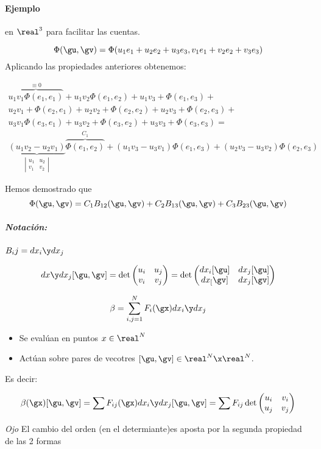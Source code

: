 \paragraph{Ejemplo} en $\real^3$ para facilitar las cuentas.

\[\Phi(\gu,\gv) = \Phi(u_1e_1+u_2e_2+u_3e_3,v_1e_1+v_2e_2+v_3e_3)\]
Aplicando las propiedades anteriores obtenemos:

\begin{gather*}
\overbrace{u_1v_1\Phi(e_1,e_1)}^{\equiv 0} + u_1v_2\Phi(e_1,e_2) + u_1v_3+\Phi(e_1,e_3)+\\
u_2v_1+\Phi(e_2,e_1)+u_2v_2+\Phi(e_2,e_2)+u_2v_3+\Phi(e_2,e_3)+\\
u_3v_1\Phi(e_3,e_1)+u_3v_2+\Phi(e_3,e_2)+u_3v_3+\Phi(e_3,e_3) = \\
\underbrace{(u_1v_2-u_2v_1)}_{\left|\begin{matrix}
u_1&u_2\\v_1&v_2
\end{matrix}\right|}\overbrace{\Phi(e_1,e_2)}^{C_1}+(u_1v_3-u_3v_1)\Phi(e_1,e_3)+(u_2v_3-u_3v_2)\Phi(e_2,e_3)
\end{gather*}

Hemos demostrado que \[\Phi(\gu,\gv) = C_1B_{12}(\gu,\gv) + C_2B_{13}(\gu,\gv) + C_3B_{23}(\gu,\gv)\]

\subparagraph{Notación:} $B_ij = dx_i\y dx_j$

\[dx\y dx_j [\gu,\gv] = \det \begin{pmatrix}
u_i&u_j\\v_i&v_j
\end{pmatrix} = \det \begin{pmatrix}
dx_i[\gu]&dx_j[\gu]\\dx_[\gv]&dx_j[\gv]
\end{pmatrix}\]

\begin{defn}[2-forma]
\[\beta = \sum_{i,j=1}^N F_i(\gx) dx_i\y dx_j\]
\begin{itemize}
\item Se evalúan en puntos $x\in\real^N$
\item Actúan sobre pares de vecotres $[\gu,\gv]\in\real^N\x\real^N$.
\end{itemize}

Es decir:

\[\beta(\gx)[\gu,\gv] = \sum F_{ij}(\gx) dx_i\y dx_j[\gu,\gv] = \sum F_{ij} \det \begin{pmatrix}
u_i&v_i\\u_j&v_j
\end{pmatrix}\]

\emph{Ojo} El cambio del orden (en el determiante)es aposta por la segunda propiedad de las 2 formas
\end{defn}



